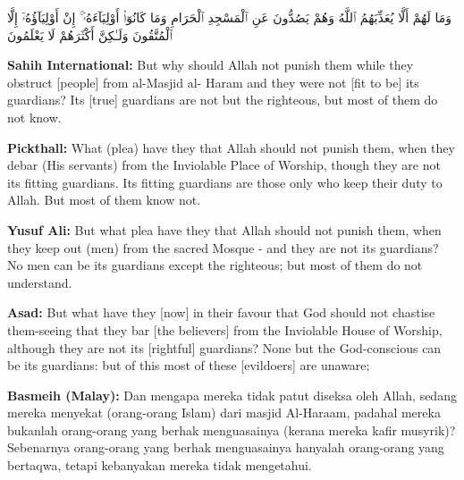 \documentclass[11pt,a4paper,openany]{book}
\let\textAR\textarabic
\newcommand{\quranverse}[1]{{\centering\Large\textAR{#1}\par}}
\begin{document}
\begin{quranbox}[Qur'an 8:34]
\quranverse{وَمَا لَهُمْ أَلَّا يُعَذِّبَهُمُ ٱللَّهُ وَهُمْ يَصُدُّونَ عَنِ ٱلْمَسْجِدِ ٱلْحَرَامِ وَمَا كَانُوٓا۟ أَوْلِيَآءَهُۥٓ ۚ إِنْ أَوْلِيَآؤُهُۥٓ إِلَّا ٱلْمُتَّقُونَ وَلَـٰكِنَّ أَكْثَرَهُمْ لَا يَعْلَمُونَ}

\vspace{6pt}
\noindent\textbf{Sahih International:} But why should Allah not punish them while they obstruct [people] from al-Masjid al- Haram and they were not [fit to be] its guardians? Its [true] guardians are not but the righteous, but most of them do not know.

\vspace{4pt}
\noindent\textbf{Pickthall:} What (plea) have they that Allah should not punish them, when they debar (His servants) from the Inviolable Place of Worship, though they are not its fitting guardians. Its fitting guardians are those only who keep their duty to Allah. But most of them know not.

\vspace{4pt}
\noindent\textbf{Yusuf Ali:} But what plea have they that Allah should not punish them, when they keep out (men) from the sacred Mosque - and they are not its guardians? No men can be its guardians except the righteous; but most of them do not understand.

\vspace{4pt}
\noindent\textbf{Asad:} But what have they [now] in their favour that God should not chastise them-seeing that they bar [the believers] from the Inviolable House of Worship, although they are not its [rightful] guardians? None but the God-conscious can be its guardians: but of this most of these [evildoers] are unaware;

\vspace{4pt}
\noindent\textbf{Basmeih (Malay):} Dan mengapa mereka tidak patut diseksa oleh Allah, sedang mereka menyekat (orang-orang Islam) dari masjid Al-Haraam, padahal mereka bukanlah orang-orang yang berhak menguasainya (kerana mereka kafir musyrik)? Sebenarnya orang-orang yang berhak menguasainya hanyalah orang-orang yang bertaqwa, tetapi kebanyakan mereka tidak mengetahui.
\end{quranbox}
\end{document}
